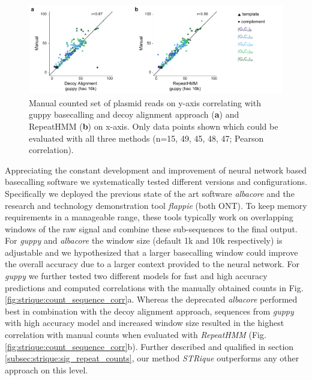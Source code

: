 \begin{figure}[h]
    \centering
    \includegraphics[width=1.0\textwidth]{figures/strique/count_seq_manual.pdf}
    \captionsetup{format=plain}
    \caption[Correlation and strand bias in STR analysis methods]{Manual counted set of plasmid reads on y-axis correlating with guppy basecalling and decoy alignment approach (\textbf{a}) and RepeatHMM (\textbf{b}) on x-axis. Only data points shown which could be evaluated with all three methods (n=15, 49, 45, 48, 47; Pearson correlation).}
    \label{fig:strique:count_seq_manual}
\end{figure}

Appreciating the constant development and improvement of neural network based basecalling software \cite{Wick2019} we systematically tested different versions and configurations. Specifically we deployed the previous state of the art software \textit{albacore} and the research and technology demonstration tool \textit{flappie} (both ONT). To keep memory requirements in a manageable range, these tools typically work on overlapping windows of the raw signal and combine these sub-sequences to the final output. For \textit{guppy} and \textit{albacore} the window size (default 1k and 10k respectively) is adjustable and we hypothesized that a larger basecalling window could improve the overall accuracy due to a larger context provided to the neural network. For \textit{guppy} we further tested two different models for fast and high accuracy predictions and computed correlations with the manually obtained counts in Fig. \ref{fig:strique:count_sequence_corr}a. 
Whereas the deprecated \textit{albacore} performed best in combination with the decoy alignment approach, sequences from \textit{guppy} with high accuracy model and increased window size resulted in the highest correlation with manual counts when evaluated with \textit{RepeatHMM} (Fig. \ref{fig:strique:count_sequence_corr}b). Further described and qualified in section \ref{subsec:strique:sig_repeat_counts}, our method \textit{STRique} outperforms any other approach on this level.

